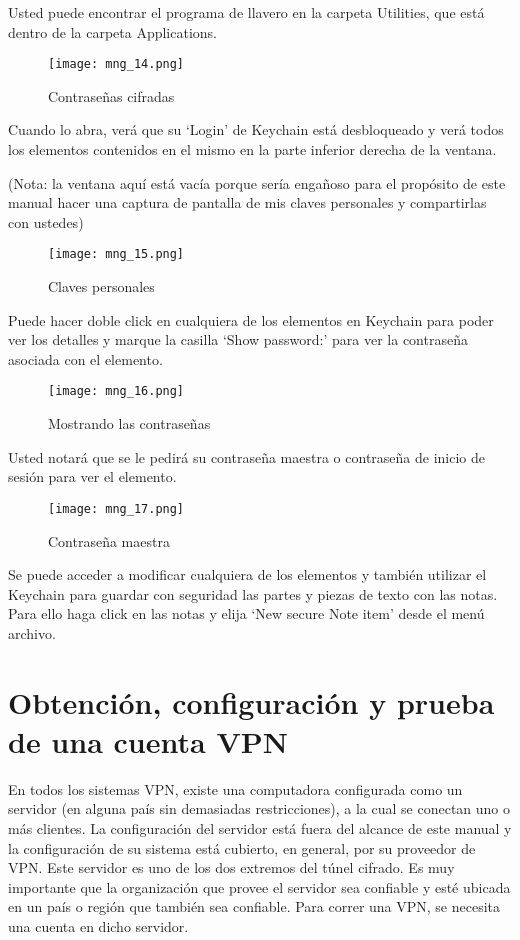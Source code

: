 \documentclass[10pt,a5paper,twoside,,]{book}
\begin{document}
Usted puede encontrar el programa de llavero en la carpeta Utilities,
que está dentro de la carpeta Applications.

\begin{figure}[htbp]
\centering
\texttt{[image: mng\_14.png]}
\caption{Contraseñas cifradas}
\end{figure}

Cuando lo abra, verá que su `Login' de Keychain está desbloqueado y verá
todos los elementos contenidos en el mismo en la parte inferior derecha
de la ventana.

(Nota: la ventana aquí está vacía porque sería engañoso para el
propósito de este manual hacer una captura de pantalla de mis claves
personales y compartirlas con ustedes)

\begin{figure}[htbp]
\centering
\texttt{[image: mng\_15.png]}
\caption{Claves personales}
\end{figure}

Puede hacer doble click en cualquiera de los elementos en Keychain para
poder ver los detalles y marque la casilla `Show password:' para ver la
contraseña asociada con el elemento.

\begin{figure}[htbp]
\centering
\texttt{[image: mng\_16.png]}
\caption{Mostrando las contraseñas}
\end{figure}

Usted notará que se le pedirá su contraseña maestra o contraseña de
inicio de sesión para ver el elemento.

\begin{figure}[htbp]
\centering
\texttt{[image: mng\_17.png]}
\caption{Contraseña maestra}
\end{figure}

Se puede acceder a modificar cualquiera de los elementos y también
utilizar el Keychain para guardar con seguridad las partes y piezas de
texto con las notas. Para ello haga click en las notas y elija `New
secure Note item' desde el menú archivo.

\chapter{Obtención, configuración y prueba de una cuenta
VPN}\label{obtenciuxf3n-configuraciuxf3n-y-prueba-de-una-cuenta-vpn}

En todos los sistemas VPN, existe una computadora configurada como un
servidor (en alguna país sin demasiadas restricciones), a la cual se
conectan uno o más clientes. La configuración del servidor está fuera
del alcance de este manual y la configuración de su sistema está
cubierto, en general, por su proveedor de VPN. Este servidor es uno de
los dos extremos del túnel cifrado. Es muy importante que la
organización que provee el servidor sea confiable y esté ubicada en un
país o región que también sea confiable. Para correr una VPN, se
necesita una cuenta en dicho servidor.
\end{document}
